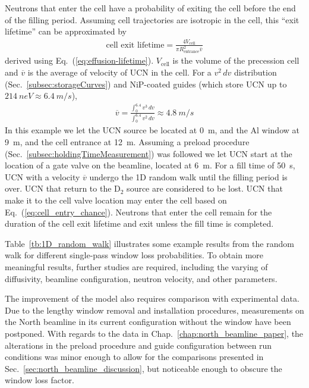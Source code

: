 Neutrons that enter the cell have a probability of exiting the cell before the end of the filling period. Assuming cell trajectories are isotropic in the cell, this ``exit lifetime'' can be approximated by
%
\begin{gather}
    \text{cell exit lifetime} = \frac{4V_\text{cell}}{\pi R_\text{entrance}^2 \overline{v}}
\end{gather}
%
derived using Eq.~(\ref{eq:effusion-lifetime}). $V_\text{cell}$ is the volume of the precession cell and $\overline{v}$ is the average of velocity of UCN in the cell. For a $v^2\,dv$ distribution (Sec.~\ref{subsec:storageCurves}) and NiP-coated guides (which store UCN up to $\qty{214}{neV}\approx\qty{6.4}{m\per s}$), 
%
\begin{gather}
    \overline{v}=\frac{\int_0^{6.4}{v^3\,dv}}{\int_0^{6.4}{v^2\,dv}}\approx \qty{4.8}{m\per s}
\end{gather}
%
In this example we let the UCN source be located at \qty{0}{m}, and the Al window at \qty{9}{m}, and the cell entrance at \qty{12}{m}. Assuming a preload procedure (Sec.~\ref{subsec:holdingTimeMeasurement}) was followed we let UCN start at the location of a gate valve on the beamline, located at \qty{6}{m}. For a fill time of \qty{50}{s}, UCN with a velocity $\overline{v}$ undergo the 1D random walk until the filling period is over. UCN that return to the D$_2$ source are considered to be lost. UCN that make it to the cell valve location may enter the cell based on Eq.~(\ref{eq:cell_entry_chance}). Neutrons that enter the cell remain for the duration of the cell exit lifetime and exit unless the fill time is completed.

Table~\ref{tb:1D_random_walk} illustrates some example results from the random walk for different single-pass window loss probabilities. To obtain more meaningful results, further studies are required, including the varying of diffusivity, beamline configuration, neutron velocity, and other parameters. 

The improvement of the model also requires comparison with experimental data. Due to the lengthy window removal and installation procedures, measurements on the North beamline in its current configuration without the window have been postponed. With regards to the data in Chap.~\ref{chap:north_beamline_paper}, the alterations in the preload procedure and guide configuration between run conditions was minor enough to allow for the comparisons presented in Sec.~\ref{sec:north_beamline_discussion}, but noticeable enough to obscure the window loss factor.


